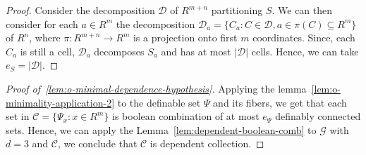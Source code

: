 \begin{proof}

    Consider the decomposition $\mathcal{D}$ of $R^{m+n}$ partitioning $S$. We can then consider for each $a \in R^m$ the decomposition $\mathcal{D}_a = \{C_a: C \in \mathcal{D}, a \in \pi(C) \subseteq R^m\}$ of $R^n$, where $\pi: R^{m+n} \to R^m$ is a projection onto first $m$ coordinates. Since, each $C_a$ is still a cell, $\mathcal{D}_a$ decomposes $S_a$ and has at most $|\mathcal{D}|$ cells. Hence, we can take $e_S = |\mathcal{D}|$.
\end{proof}

\begin{proof}[Proof of~\ref{lem:o-minimal-dependence-hypothesis}]

    Applying the lemma~\ref{lem:o-minimality-application-2} to the definable set $\Psi$ and its fibers, we get that each set in $\mathcal{C} = \{\Psi_x: x \in R^m\}$ is boolean combination of at most $e_{\Psi}$ definably connected sets. Hence, we can apply the Lemma~\ref{lem:dependent-boolean-comb} to $\mathcal{G}$ with $d=3$ and $\mathcal{C}$, we conclude that $\mathcal{C}$ is dependent collection.
\end{proof}
